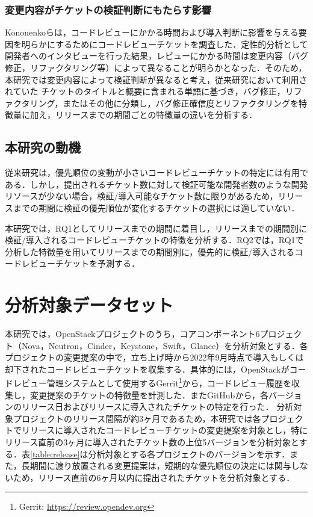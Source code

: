 \documentclass[T,J]{fose} %
\begin{document}
\subsubsection{変更内容がチケットの検証判断にもたらす影響}
Kononenko\cite{release_merge}らは，コードレビューにかかる時間および導入判断に影響を与える要因を明らかにするためにコードレビューチケットを調査した．定性的分析として開発者へのインタビューを行った結果，レビューにかかる時間は変更内容（バグ修正，リファクタリング等）によって異なることが明らかとなった．そのため，本研究では変更内容によって検証判断が異なると考え，従来研究\cite{bug}\cite{refactoring}において利用されていた
チケットのタイトルと概要に含まれる単語に基づき，バグ修正，リファクタリング，またはその他に分類し，バグ修正確信度とリファクタリングを特徴量に加え，リリースまでの期間ごとの特徴量の違いを分析する．

\subsection{本研究の動機}
従来研究\cite{prioritizer}は，優先順位の変動が小さいコードレビューチケットの特定には有用である．しかし，提出されるチケット数に対して検証可能な開発者数のような開発リソースが少ない場合，検証/導入可能なチケット数に限りがあるため，リリースまでの期間に検証の優先順位が変化するチケットの選択には適していない．

本研究では，RQ1としてリリースまでの期間に着目し，リリースまでの期間別に検証/導入されるコードレビューチケットの特徴を分析する．RQ2では，RQ1で分析した特徴量を用いてリリースまでの期間別に，優先的に検証/導入されるコードレビューチケットを予測する．


\section{分析対象データセット}\label{sec:dataset}
本研究では，OpenStackプロジェクトのうち，コアコンポーネント6プロジェクト（Nova，Neutron，Cinder，Keystone，Swift，Glance）を分析対象とする．各プロジェクトの変更提案の中で，立ち上げ時から2022年9月時点で導入もしくは却下されたコードレビューチケットを収集する．具体的には，OpenStackがコードレビュー管理システムとして使用するGerrit\footnote{Gerrit: \url{https://review.opendev.org}}から，コードレビュー履歴を収集し，変更提案のチケットの特徴量を計測した．またGitHubから，各バージョンのリリース日およびリリースに導入されたチケットの特定を行った．
分析対象プロジェクトのリリース間隔が約3ヶ月であるため，本研究では各プロジェクトでリリースに導入されたコードレビューチケットの変更提案を対象とし，特にリリース直前の3ヶ月に導入されたチケット数の上位5バージョンを分析対象とする．表\ref{table:release}は分析対象とする各プロジェクトのバージョンを示す．また，長期間に渡り放置される変更提案は，短期的な優先順位の決定には関与しないため，リリース直前の6ヶ月以内に提出されたチケットを分析対象とする．
\end{document}
